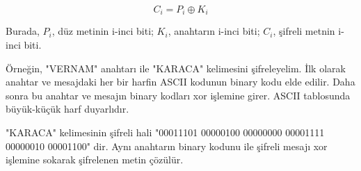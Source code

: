 \[ C_i = P_i \oplus K_i \]

Burada, $P_i$, düz metinin i-inci biti; $K_i$, anahtarın i-inci biti; $C_i$, şifreli metnin i-inci biti.

Örneğin, "VERNAM" anahtarı ile "KARACA" kelimesini şifreleyelim. İlk olarak anahtar ve mesajdaki her bir harfin ASCII kodunun binary kodu elde edilir. Daha sonra bu anahtar ve mesajın binary kodları xor işlemine girer. ASCII tablosunda büyük-küçük harf duyarlıdır.

\begin{table}[ht]
\end{table}

\begin{table}[ht]
\end{table}

"KARACA" kelimesinin şifreli hali "00011101 00000100 00000000 00001111 00000010 00001100" dir. Aynı anahtarın binary kodunu ile şifreli mesajı xor işlemine sokarak şifrelenen metin çözülür.

